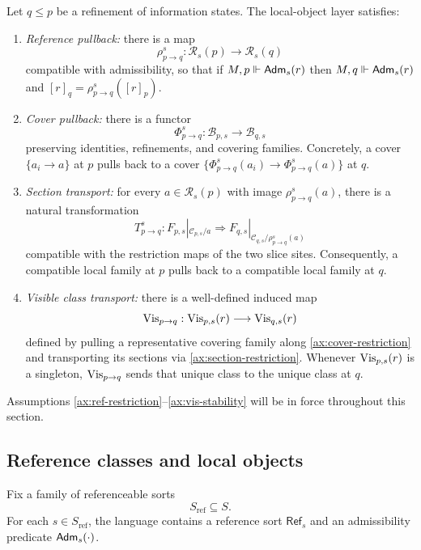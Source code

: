 \begin{definition}\label{def:refinement-axioms}
Let $q\le p$ be a refinement of information states. The local-object layer satisfies:
\begin{enumerate}[label=(RA\arabic*),nosep]
\item\label{ax:ref-restriction} \emph{Reference pullback:} there is a map
\[
\rho^{s}_{p\to q}:\mathcal{R}_s(p)\longrightarrow \mathcal{R}_s(q)
\]
compatible with admissibility, so that if $M,p\Vdash\mathsf{Adm}_s(r)$ then $M,q\Vdash\mathsf{Adm}_s(r)$ and $[r]_q=\rho^{s}_{p\to q}([r]_p)$.
\item\label{ax:cover-restriction} \emph{Cover pullback:} there is a functor
\[
\Phi^{s}_{p\to q}:\mathcal{B}_{p,s}\longrightarrow\mathcal{B}_{q,s}
\]
preserving identities, refinements, and covering families. Concretely, a cover $\{a_i\to a\}$ at $p$ pulls back to a cover $\{\Phi^{s}_{p\to q}(a_i)\to \Phi^{s}_{p\to q}(a)\}$ at $q$.
\item\label{ax:section-restriction} \emph{Section transport:} for every $a\in\mathcal{R}_s(p)$ with image $\rho^{s}_{p\to q}(a)$, there is a natural transformation
\[
T^{s}_{p\to q}:F_{p,s}|_{\mathcal{C}_{p,s}/a}\Longrightarrow F_{q,s}|_{\mathcal{C}_{q,s}/\rho^{s}_{p\to q}(a)}
\]
compatible with the restriction maps of the two slice sites. Consequently, a compatible local family at $p$ pulls back to a compatible local family at $q$.
\item\label{ax:vis-stability} \emph{Visible class transport:} there is a well-defined induced map
\[
\mathrm{Vis}_{p\to q}:\mathrm{Vis}_{p,s}(r)\longrightarrow \mathrm{Vis}_{q,s}(r)
\]
defined by pulling a representative covering family along \ref{ax:cover-restriction} and transporting its sections via \ref{ax:section-restriction}. Whenever $\mathrm{Vis}_{p,s}(r)$ is a singleton, $\mathrm{Vis}_{p\to q}$ sends that unique class to the unique class at $q$.
\end{enumerate}
\end{definition}

Assumptions \ref{ax:ref-restriction}--\ref{ax:vis-stability} will be in force throughout this section.

\subsection{Reference classes and local objects}

Fix a family of referenceable sorts
\[
S_{\mathrm{ref}}\subseteq S.
\]
For each $s\in S_{\mathrm{ref}}$, the language contains a reference sort $\mathsf{Ref}_s$ and an admissibility predicate $\mathsf{Adm}_s(\cdot)$.

